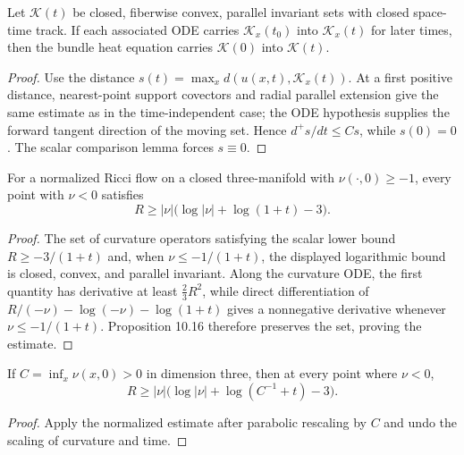 \begin{theorem}
\label{thm:chow-ii-time-dependent-system-wmp}
Let $\mathcal K(t)$ be closed, fiberwise convex, parallel invariant sets with
closed space-time track.  If each associated ODE carries $\mathcal K_x(t_0)$ into
$\mathcal K_x(t)$ for later times, then the bundle heat equation carries
$\mathcal K(0)$ into $\mathcal K(t)$.
\end{theorem}
\begin{proof}
\sketch
{}
Use the distance $s(t)=\max_xd(u(x,t),\mathcal K_x(t))$.  At a first positive
distance, nearest-point support covectors and radial parallel extension give the
same estimate as in the time-independent case; the ODE hypothesis supplies the
forward tangent direction of the moving set.  Hence $d^+s/dt\le Cs$, while
$s(0)=0$.  The scalar comparison lemma forces $s\equiv0$.
\end{proof}

\begin{theorem}
\label{thm:chow-ii-hamilton-ivey}
For a normalized Ricci flow on a closed three-manifold with
$\nu(\cdot,0)\ge-1$, every point with $\nu<0$ satisfies
\[
R\ge|\nu|\bigl(\log|\nu|+\log(1+t)-3\bigr).
\]
\end{theorem}
\begin{proof}
\sketch
{}
The set of curvature operators satisfying the scalar lower bound
$R\ge-3/(1+t)$ and, when $\nu\le-1/(1+t)$, the displayed logarithmic bound is
closed, convex, and parallel invariant.  Along the curvature ODE, the first
quantity has derivative at least $\frac23R^2$, while direct differentiation of
\(R/(-\nu)-\log(-\nu)-\log(1+t)\) gives a nonnegative derivative whenever
$\nu\le-1/(1+t)$.  Proposition 10.16 therefore preserves the set, proving the
estimate.
\end{proof}

\begin{corollary}
\label{cor:chow-ii-hamilton-ivey-scaling}
If $C=\inf_x\nu(x,0)>0$ in dimension three, then at every point where
$\nu<0$,
\[
R\ge|\nu|\bigl(\log|\nu|+\log(C^{-1}+t)-3\bigr).
\]
\end{corollary}
\begin{proof}
\sketch
Apply the normalized estimate after parabolic rescaling by $C$ and undo the
scaling of curvature and time.
\end{proof}

